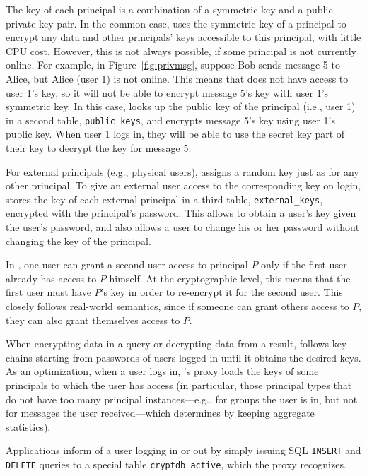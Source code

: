 The key of each principal is  a combination of a symmetric key
and a public--private key pair.  In the common case, \name uses the
symmetric key of a principal to encrypt any data and other principals'
keys accessible to this principal, with little CPU cost.  However, this is not always
possible, if some principal is not currently online.  For example,
in Figure~\ref{fig:privmsg}, suppose Bob sends message 5 to Alice, but
Alice (user 1) is not online.  This means that \name does not have access
to user 1's key, so it will not be able to encrypt message 5's key with
user 1's symmetric key.  In this case, \name looks up the public key
of the principal (i.e., user 1) in a second table, \texttt{public\_keys}, and encrypts
message 5's key using user 1's public key.  When user 1 logs in, they
will be able to use the secret key part of their key to decrypt the
key for message 5.

For external principals (e.g., physical users), \name assigns a
random key just as for any other principal.  To give an external user
access to the corresponding key on login, \name stores the key of each
external principal in a third table, \texttt{external\_keys}, encrypted
with the principal's password.  This allows \name to obtain a user's
key given the user's password, and also allows a user to change his or
her password without changing the key of the principal.

In \name{}, one user can grant a second user access to principal $P$
only if the first user already has access to $P$ himself.  At the
cryptographic level, this means that the first user must have $P$'s
key in order to re-encrypt it for the second user.  This closely
follows real-world semantics, since if someone can grant others
access to $P$, they can also grant themselves access to $P$.

When encrypting data in a query or decrypting data from a result,
\name{} follows key chains starting from passwords of users logged in
until it obtains the desired keys. As an optimization, when a user
logs in, \name{}'s proxy loads the keys of some principals to which
the user has access (in particular, those principal types that do not
have too many principal instances---e.g., for groups the user is in,
but not for messages the user received---which \name determines by
keeping aggregate statistics).

Applications inform \name{} of a user logging in or out by simply
issuing SQL {\tt INSERT} and {\tt DELETE} queries to a special table
\texttt{cryptdb\_active}, which the proxy recognizes.

